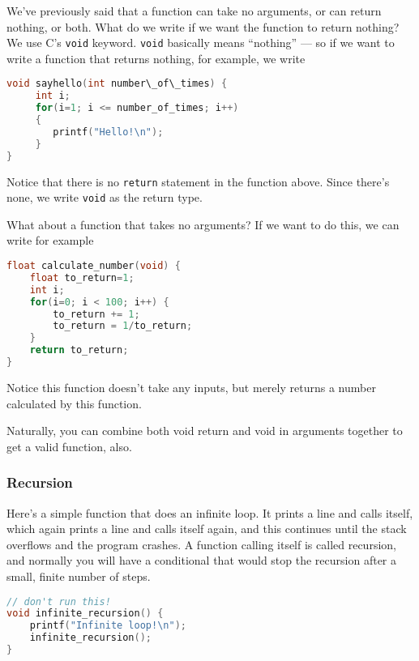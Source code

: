 We've previously said that a function can take no arguments, or can return
nothing, or both. What do we write if we want the function to return nothing?
We use C's \texttt{void} keyword. \texttt{void} basically means ``nothing'' ---
so if we want to write a function that returns nothing, for example, we write

\lstset{basicstyle=\scriptsize, numbers=left, captionpos=b, tabsize=4}
\begin{lstlisting}[caption=Section \thesection listing \arabic{funccnt},language={C},
breaklines=true,xleftmargin=15pt, label=lst:section\thesection listing\arabic{funccnt}]
void sayhello(int number\_of\_times) {
	 int i;
	 for(i=1; i <= number_of_times; i++)
	 {
	    printf("Hello!\n");
	 }
}
\end{lstlisting}

Notice that there is no \texttt{return} statement in the function above. Since
there's none, we write \texttt{void} as the return type.

What about a function that takes no arguments? If we want to do this, we can
write for example

\lstset{basicstyle=\scriptsize, numbers=left, captionpos=b, tabsize=4}
\begin{lstlisting}[caption=Section \thesection listing \arabic{funccnt},language={C},
breaklines=true,xleftmargin=15pt, label=lst:section\thesection listing\arabic{funccnt}]
float calculate_number(void) {
	float to_return=1;
	int i;
	for(i=0; i < 100; i++) {
		to_return += 1;
		to_return = 1/to_return;
	}
	return to_return;
}
\end{lstlisting}

Notice this function doesn't take any inputs, but merely returns a number
calculated by this function.

Naturally, you can combine both void return and void in arguments together to
get a valid function, also.

\subsubsection{Recursion}
Here's a simple function that does an infinite loop. It prints a line and calls
itself, which again prints a line and calls itself again, and this continues
until the stack overflows and the program crashes. A function calling itself is
called recursion, and normally you will have a conditional that would stop the
recursion after a small, finite number of steps.
\begin{lstlisting}[caption=Section \thesection listing \arabic{funccnt},language={C},
breaklines=true,xleftmargin=15pt, label=lst:section\thesection listing\arabic{funccnt}]
	     // don't run this!
void infinite_recursion() {
	printf("Infinite loop!\n");
	infinite_recursion();
}
\end{lstlisting}

